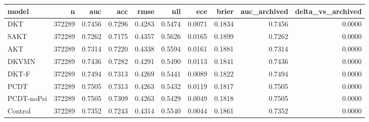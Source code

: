 \begin{tabular}{lrrrrrrrrr}
\toprule
model & n & auc & acc & rmse & nll & ece & brier & auc\_archived & delta\_vs\_archived \\
\midrule
DKT & 372289 & 0.7456 & 0.7296 & 0.4283 & 0.5474 & 0.0071 & 0.1834 & 0.7456 & 0.0000 \\
SAKT & 372289 & 0.7262 & 0.7175 & 0.4357 & 0.5626 & 0.0165 & 0.1899 & 0.7262 & 0.0000 \\
AKT & 372289 & 0.7314 & 0.7220 & 0.4338 & 0.5594 & 0.0161 & 0.1881 & 0.7314 & 0.0000 \\
DKVMN & 372289 & 0.7436 & 0.7282 & 0.4291 & 0.5490 & 0.0113 & 0.1841 & 0.7436 & 0.0000 \\
DKT-F & 372289 & 0.7494 & 0.7313 & 0.4269 & 0.5441 & 0.0089 & 0.1822 & 0.7494 & 0.0000 \\
PCDT & 372289 & 0.7505 & 0.7313 & 0.4263 & 0.5432 & 0.0119 & 0.1817 & 0.7505 & 0.0000 \\
PCDT-noPsi & 372289 & 0.7505 & 0.7309 & 0.4263 & 0.5429 & 0.0049 & 0.1818 & 0.7505 & 0.0000 \\
Control & 372289 & 0.7352 & 0.7243 & 0.4314 & 0.5540 & 0.0044 & 0.1861 & 0.7352 & 0.0000 \\
\bottomrule
\end{tabular}
